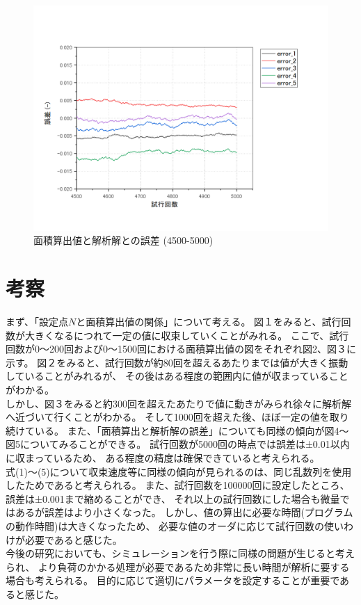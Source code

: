 \documentclass[12pt,a4paper]{jsarticle}
\begin{document}
\begin{figure}[htbp]
    \begin{center}
        \includegraphics[width=150mm]{error_4500-5000.png}
        \caption{面積算出値と解析解との誤差 (4500-5000)}
    \end{center}
\end{figure}

\newpage
\section{考察}
まず、「設定点$N$と面積算出値の関係」について考える。
図１をみると、試行回数が大きくなるにつれて一定の値に収束していくことがみれる。
ここで、試行回数が0〜200回および0〜1500回における面積算出値の図をそれぞれ図2、図３に示す。
図２をみると、試行回数が約80回を超えるあたりまでは値が大きく振動していることがみれるが、
その後はある程度の範囲内に値が収まっていることがわかる。\\
しかし、図３をみると約300回を超えたあたりで値に動きがみられ徐々に解析解へ近づいて行くことがわかる。
そして1000回を超えた後、ほぼ一定の値を取り続けている。
また、「面積算出と解析解の誤差」についても同様の傾向が図4〜図5についてみることができる。
試行回数が5000回の時点では誤差は±0.01以内に収まっているため、
ある程度の精度は確保できていると考えられる。\\
式(1)〜(5)について収束速度等に同様の傾向が見られるのは、同じ乱数列を使用したためであると考えられる。
また、試行回数を100000回に設定したところ、誤差は±0.001まで縮めることができ、
それ以上の試行回数にした場合も微量ではあるが誤差はより小さくなった。
しかし、値の算出に必要な時間(プログラムの動作時間)は大きくなったため、
必要な値のオーダに応じて試行回数の使いわけが必要であると感じた。\\
今後の研究においても、シミュレーションを行う際に同様の問題が生じると考えられ、
より負荷のかかる処理が必要であるため非常に長い時間が解析に要する場合も考えられる。
目的に応じて適切にパラメータを設定することが重要であると感じた。
\end{document}
